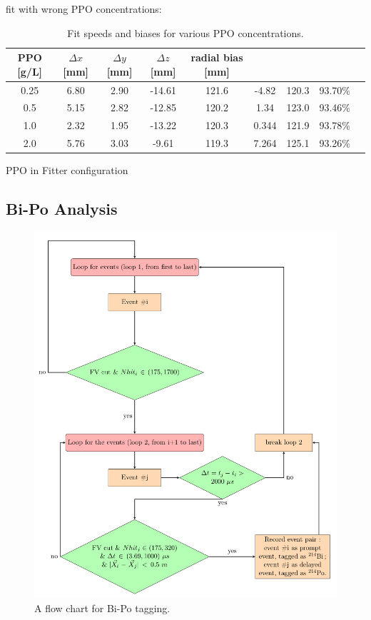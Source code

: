 fit with wrong PPO concentrations:  
\begin{table}[ht]
	\centering
	\caption{\label{partial_bias} Fit speeds and biases for various PPO concentrations.}	
	{\centering
		\begin{tabular*}{150mm}{c@{\extracolsep{\fill}}cccccccc}
			\toprule 
			PPO [g/L] & $\Delta x$ [mm]& $\Delta y$ [mm]& $\Delta z$ [mm] & radial bias [mm] &  & &\\
			\midrule
			0.25 & 6.80& 2.90& -14.61& 121.6& -4.82& 120.3& 93.70\%\\
			0.5  & 5.15& 2.82& -12.85 &120.2 &1.34 &123.0 &93.46\% \\
			1.0 &2.32 &1.95 &-13.22& 120.3& 0.344& 121.9 &93.78\% \\
			2.0 &5.76& 3.03& -9.61& 119.3& 7.264 &125.1& 93.26\% \\
			\bottomrule	
		\end{tabular*}
	}
\end{table}



PPO in Fitter
configuration


\subsection{Bi-Po Analysis}

\begin{figure}[!htb]
	\centering
	\includegraphics[width=15cm]{flowchart_latex.pdf}
	\caption{A flow chart for Bi-Po tagging.}
	\label{biPo_flowchart}
\end{figure}




